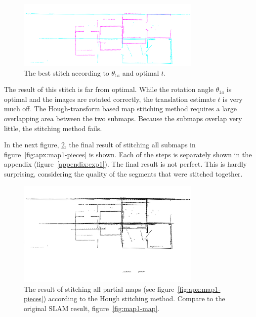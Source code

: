 \begin{figure}[ht]
  \centering
  \includegraphics[width=0.8\textwidth]{images/experiment/map1/stitch1-1a-result.png}
  \caption{The best stitch according to $\theta_{1a}$ and optimal $t$.}
  \label{fig:exp:1:result1}
\end{figure}

The result of this stitch is far from optimal. While the rotation angle $\theta_{1a}$ is optimal and the images are rotated correctly, the translation estimate $t$ is very much off. The Hough-transform based map stitching method requires a large overlapping area between the two submaps. Because the submaps overlap very little, the stitching method fails.

In the next figure, \ref{fig:exp:1:result8}, the final result of stitching all submaps in figure~\ref{fig:apx:map1-pieces} is shown. Each of the steps is separately shown in the appendix (figure~\ref{appendix:exp1}). The final result is not perfect. This is hardly surprising, considering the quality of the segments that were stitched together.

\begin{figure}[ht]
  \centering
  \includegraphics[width=0.8\textwidth]{images/experiment/map1/result/step8.png}
  \caption{The result of stitching all partial maps (see figure~\ref{fig:apx:map1-pieces}) according to the Hough stitching method. Compare to the original SLAM result, figure~\ref{fig:map1-map}.}
  \label{fig:exp:1:result8}
\end{figure}

